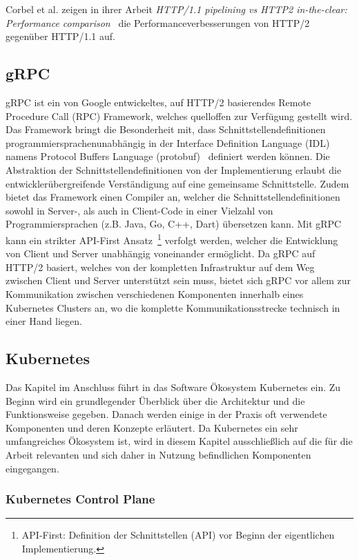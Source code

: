 Corbel et al. zeigen in ihrer Arbeit \textit{HTTP/1.1 pipelining vs HTTP2 in-the-clear: Performance comparison}~\cite{7745823} die Performanceverbesserungen von HTTP/2 gegenüber HTTP/1.1 auf.

\subsection{gRPC}\label{subsec:grpc}
gRPC ist ein von Google entwickeltes, auf HTTP/2 basierendes Remote Procedure Call (RPC) Framework, welches quelloffen zur Verfügung gestellt wird.
Das Framework bringt die Besonderheit mit, dass Schnittstellendefinitionen programmiersprachenunabhängig in der Interface Definition Language (IDL) namens Protocol Buffers Language (protobuf)~\cite{protobuf} definiert werden können.
Die Abstraktion der Schnittstellendefinitionen von der Implementierung erlaubt die entwicklerübergreifende Ver\-stän\-di\-gung auf eine gemeinsame Schnittstelle.
Zudem bietet das Framework einen Compiler an, welcher die Schnittstellendefinitionen sowohl in Server-, als auch in Client-Code in einer Vielzahl von Programmiersprachen (z.B. Java, Go, C++, Dart) übersetzen kann.
Mit gRPC kann ein strikter API-First Ansatz~\footnote{API-First: Definition der Schnittstellen (API) vor Beginn der eigentlichen Implementierung.} verfolgt werden, welcher die Entwicklung von Client und Server unabhängig voneinander ermöglicht.
Da gRPC auf HTTP/2 basiert, welches von der kompletten Infrastruktur auf dem Weg zwischen Client und Server unterstützt sein muss, bietet sich gRPC vor allem zur Kommunikation zwischen verschiedenen Komponenten innerhalb eines Kubernetes Clusters an, wo die komplette Kommunikationsstrecke technisch in einer Hand liegen.

\subsection{Kubernetes}\label{subsec:kubernetes}
Das Kapitel im Anschluss führt in das Software Ökosystem Kubernetes ein.
Zu Beginn wird ein grundlegender Überblick über die Architektur und die Funktionsweise gegeben.
Danach werden einige in der Praxis oft verwendete Komponenten und deren Konzepte erläutert.
Da Kubernetes ein sehr umfangreiches Ökosystem ist, wird in diesem Kapitel ausschließlich auf die für die Arbeit relevanten und sich daher in Nutzung befindlichen Komponenten eingegangen.

\subsubsection{Kubernetes Control Plane}


